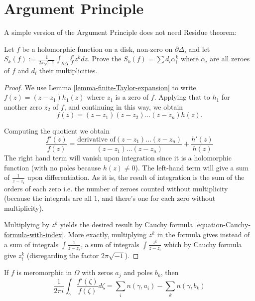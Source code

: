 \section{Argument Principle}
\label{section-argument-principle}

\noindent
A simple version of the Argument Principle does not need Residue theorem:

\begin{exercise}
\label{exercise-argument-principle}
Let $f$ be a holomorphic function on a disk, non-zero on $\partial \Delta$, and
let $S_k(f):=\frac{1}{2\pi\sqrt{-1}}\int_{\partial\Delta}\frac{f'}{f}z^kdz$.
Prove the $S_k(f)=\sum d_i\alpha_i^k$ where $\alpha_i$ are all zeroes of $f$ and
$d_i$ their multiplicities.
\end{exercise}

\begin{proof}
We use Lemma \ref{lemma-finite-Taylor-expansion} to write
$f(z)=(z-z_1)h_1(z)$ where $z_1$ is a zero of $f$. 
Applying that to $h_1$ for another zero  $z_2$ of $f$,
and continuing in this way, we obtain 
\begin{equation}
\label{equation-factor-zeroes}
f(z)=(z-z_1)(z-z_2)\ldots(z-z_n)h(z).
\end{equation}

\noindent
Computing the quotient we obtain
$$
\frac{f'(z)}{f(z)}=\frac{\text{derivative of
$(z-z_1)\ldots(z-z_n)$}}{(z-z_1)\ldots(z-z_n)}+\frac{h'(z)}{h(z)}
$$
The right hand term will vanish upon integration since it is a holomorphic
function (with no poles because $h(z)\neq 0$). The left-hand term will give a
sum of $\frac{1}{z-z_i}$ upon differentiation. As it is, the result of
integration is the sum of the orders of each zero i.e. the number of zeroes
counted without multiplicity 
(because the integrals are all 1, and there's one for each zero without
multiplicity).

Multiplying by $z^k$ yields the desired result by Cauchy formula
\ref{equation-Cauchy-formula-with-index}. More exactly,
multiplying $z^k$ in the formula gives instead of a sum
of integrals $\int \frac{1}{z-z_i}$, a sum of integrals
$\int\frac{z^k}{z-z_i}$ which by Cauchy formula give $z_i^k$
(disregarding the factor $2\pi\sqrt{-1}$).
\end{proof}

\begin{theorem}
\label{theorem-argument-principle-and-Rouche-theorem}
\begin{reference}
\cite[Chapter 5, Theorem 18]{ahl}
\end{reference}
If $f$ is meromorphic in $\Omega$ with zeros $a_j$ and poles $b_k$, then
\begin{equation}
\label{equation-argument-principle}
\frac{1}{2\pi i}\int_\gamma\frac{f'(\zeta)}{f(\zeta)}d\zeta
=\sum_{i}n(\gamma,a_i)-\sum_{k}n(\gamma,b_k)
\end{equation}
\end{theorem}

